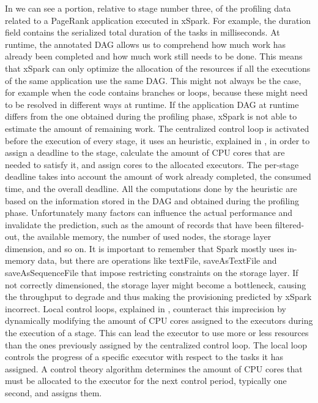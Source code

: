 In  we can see a portion, relative to stage number three, of the profiling data related to a PageRank application executed in xSpark.
For example, the duration field contains the serialized total duration of the tasks in
milliseconds.
At runtime, the annotated DAG allows us to comprehend how much
work has already been completed and how much work still needs to
be done. This means that xSpark can only optimize the allocation
of the resources if all the executions of the same application use the
same DAG. This might not always be the case, for example when the
code contains branches or loops, because these might need to be resolved
in different ways at runtime. If the application DAG at runtime differs from the one obtained during the profiling phase, xSpark is
not able to estimate the amount of remaining work.
The centralized control loop is activated before the execution of
every stage, it uses an heuristic, explained in , in order
to assign a deadline to the stage, calculate the amount of CPU cores
that are needed to satisfy it, and assign cores to the allocated executors.
The per-stage deadline takes into account the amount of work
already completed, the consumed time, and the overall deadline. All
the computations done by the heuristic are based on the information
stored in the DAG and obtained during the profiling phase. Unfortunately
many factors can influence the actual performance and
invalidate the prediction, such as the amount of records that have
been filtered-out, the available memory, the number of used nodes,
the storage layer dimension, and so on. It is important to remember
that Spark mostly uses in-memory data, but there are operations like
textFile, saveAsTextFile and saveAsSequenceFile that impose restricting
constraints on the storage layer. If not correctly dimensioned,
the storage layer might become a bottleneck, causing the throughput
to degrade and thus making the provisioning predicted by xSpark
incorrect.
Local control loops, explained in , counteract this imprecision
by dynamically modifying the amount of CPU cores assigned
to the executors during the execution of a stage. This can lead
the executor to use more or less resources than the ones previously
assigned by the centralized control loop. The local loop controls the
progress of a specific executor with respect to the tasks it has assigned.
A control theory algorithm determines the amount of CPU cores that
must be allocated to the executor for the next control period, typically
one second, and assigns them.
